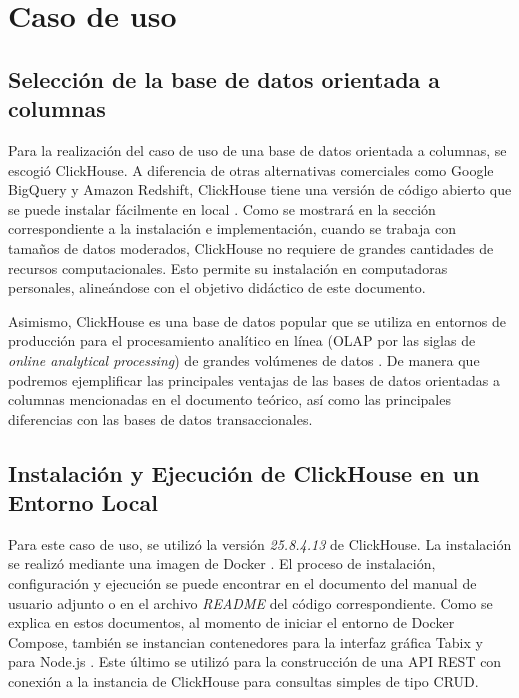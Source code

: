 \section{Caso de uso}




\subsection{Selección de la base de datos orientada a columnas}
Para la realización del caso de uso de una base de datos orientada a columnas, se escogió ClickHouse. A diferencia de otras alternativas comerciales como Google BigQuery y Amazon Redshift, ClickHouse tiene una versión de código abierto que se puede instalar fácilmente en local \parencite{clickhouse_intro}. Como se mostrará en la sección correspondiente a la instalación e implementación, cuando se trabaja con tamaños de datos moderados, ClickHouse no requiere de grandes cantidades de recursos computacionales. Esto permite su instalación en computadoras personales, alineándose con el objetivo didáctico de este documento.

Asimismo, ClickHouse es una base de datos popular que se utiliza en entornos de producción para el procesamiento analítico en línea (OLAP por las siglas de \textit{online analytical processing}) de grandes volúmenes de datos \parencite{clickhouse_intro}. De manera que podremos ejemplificar las principales ventajas de las bases de datos orientadas a columnas mencionadas en el documento teórico, así como las principales diferencias con las bases de datos transaccionales.
\\

\subsection{Instalación y Ejecución de ClickHouse en un Entorno Local}
Para este caso de uso, se utilizó la versión \textit{25.8.4.13} de  ClickHouse. La instalación se realizó mediante una imagen de Docker \parencite{clickhouse_docker}. El proceso de instalación, configuración y ejecución se puede encontrar en el documento del manual de usuario adjunto o en el archivo \emph{README} del código correspondiente. Como se explica en estos documentos, al momento de iniciar el entorno de Docker Compose, también se instancian contenedores para la interfaz gráfica Tabix \parencite{tabix_docker} y para Node.js \parencite{node_docker}. Este último se utilizó para la construcción de una API REST con conexión a la instancia de ClickHouse para consultas simples de tipo CRUD. 

